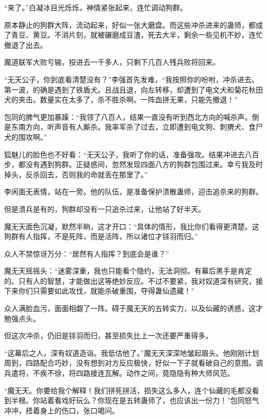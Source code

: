 
\begin{this_body}

“来了。”白凝冰目光烁烁，神情紧张起来，连忙调动狗群。

原本静止的狗群大阵，流动起来，好似一张大磨盘。而这些冲杀进来的蛊师，都成了青豆、黄豆。不消片刻，就被碾磨成豆渣，死去大半，剩余一些见机不妙，连忙撤退了出去。

魔道联军大败亏输，投进去一千多人，只剩下几百人残兵败将回来。

“无天公子，你到底看清楚没有？”李强首先发难，“我按照你的吩咐，冲杀进去。第一波，的确是遇到了铁盾犬。且战且退，向左转移，却遭到了电文犬和菊花秋田犬的夹击。数量实在太多了，杀不胜杀啊。一阵血拼无果，只能先撤退！”

包同的脾气更加暴躁：“我领了八百人，结果一直没有听到西北方向的喊杀声。倒是东南方向，听声音有人厮杀。我率军杀了过去，立即遭到电文狗、刺猬犬、食尸犬的围攻啊。”

狐魅儿的脸色也不好看：“无天公子，我听了你的话，准备强攻。结果冲进去八百步，都没有遇到狗群。正疑惑间，忽然发现四面八方的狗群包围过来。幸亏我及时掉头，反杀回去，否则我的命就丢在那里了。”

李闲面无表情，站在一旁。他的队伍，是准备保护溃散蛊师，迎击追杀来的狗群。

但是溃兵是有的，狗群却没有一只追杀过来，让他站了好半天。

魔无天面色沉凝，默然半晌，这才开口：“具体的情形，我比你们看得更清楚。这狗群有人指挥，不是死阵，而是活阵，所以诸位才铩羽而归。”

众人不禁惊讶万分：“居然有人指挥？到底会是谁？”

魔无天摇摇头：“迷雾深重，我也只能看个隐约，无法洞彻。有幕后黑手是肯定的。只有人的智慧，才能做出这等绝妙反应。不过不要紧，我对奴道深有研究，接下来你们只需要如此攻伐，就能杀破重围，夺得蛊仙遗藏！”

众人满脸血污，面面相觑了一阵。碍于魔无天的五转实力，以及仙藏的诱惑，这才勉强点头。

但这次冲杀，仍旧是铩羽而归，甚至损失比上一次还要严重得多。

“这幕后之人，深有奴道造诣。我低估他了。”魔无天深深地皱起眉头。他刚刚计划周到，四路配合巧妙，没有想到对方反应极快，好似一下子就看破自己的意图。调兵遣将，不疾不徐，将四路接连瓦解。动作之间，竟隐隐有种大师风范。

“魔无天。你要给我个解释！我们拼死拼活，损失这么多人，连个仙藏的毛都没看到半根。你站着看戏好玩么？你现在是五转蛊师了，也应该出一份力！”包同怒气冲冲，捂着身上的伤口，张口喝问。


\end{this_body}
